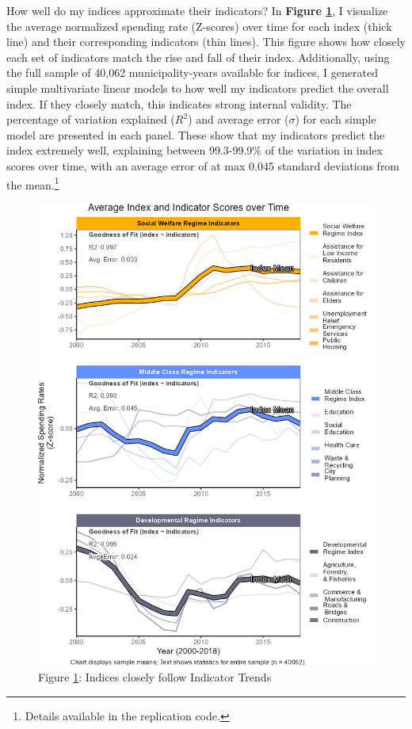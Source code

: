 \documentclass[preprint, 3p,
authoryear]{elsarticle} %
\begin{document}
How well do my indices approximate their indicators? In
\textbf{Figure \ref{fig:lines}}, I visualize the average normalized
spending rate (Z-scores) over time for each index (thick line) and their
corresponding indicators (thin lines). This figure shows how closely
each set of indicators match the rise and fall of their index.
Additionally, using the full sample of 40,062 municipality-years
available for indices, I generated simple multivariate linear models to
how well my indicators predict the overall index. If they closely match,
this indicates strong internal validity. The percentage of variation
explained (\(R^{2}\)) and average error (\(\sigma\)) for each simple
model are presented in each panel. These show that my indicators predict
the index extremely well, explaining between 99.3-99.9\% of the
variation in index scores over time, with an average error of at max
0.045 standard deviations from the mean.\footnote{Details available in
  the replication code.}

\begin{figure}
\includegraphics[width=1\linewidth]{../viz/mean_trends} \caption{Figure \ref{fig:lines}: Indices closely follow Indicator Trends}\label{fig:lines}
\end{figure}
\end{document}
